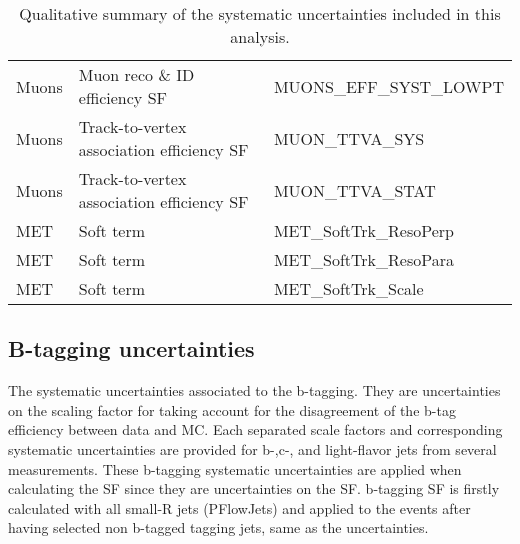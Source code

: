 \begin{table}[!hp]
\begin{center}
\begin{tabular}{|l|l|l|}
      Muons         & Muon reco \& ID efficiency SF               &   MUONS\_EFF\_SYST\_LOWPT           \\
      Muons         & Track-to-vertex association efficiency SF         &   MUON\_TTVA\_SYS             \\
      Muons         & Track-to-vertex association efficiency SF         &   MUON\_TTVA\_STAT            \\ \hline
      MET           & Soft term                       &   MET\_SoftTrk\_ResoPerp                        \\
      MET           & Soft term                       &   MET\_SoftTrk\_ResoPara                        \\
      MET           & Soft term                       &   MET\_SoftTrk\_Scale                           \\ \hline
      \end{tabular}
      \caption{ Qualitative summary of the systematic uncertainties included in this analysis. }
      \label{tab:syst_summary_sources_2}
    \end{center}
  \end{table}

\subsection{B-tagging uncertainties}
The systematic uncertainties associated to the b-tagging.
They are uncertainties on the scaling factor for taking account for the disagreement of the b-tag efficiency between data and MC. Each separated scale factors and corresponding systematic uncertainties are provided for b-,c-, and light-flavor jets from several measurements.
These b-tagging systematic uncertainties are applied when calculating the SF since they are uncertainties on the SF. b-tagging SF is firstly calculated with all small-R jets (PFlowJets) and applied to the events after having selected non b-tagged tagging jets, same as the uncertainties. 

